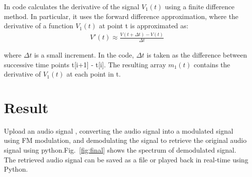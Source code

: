 \documentclass[journal,5pt,twocolumn]{IEEEtran}
\newcommand\figref{Fig.~\ref}
\begin{document}
In code calculates the derivative of the signal $V_1(t)$ using a finite difference method. In particular, it uses the forward difference approximation, where the derivative of a function $V_1(t)$ at point t is approximated as:
\begin{align}
V'(t) \approx \frac{V(t+\Delta t) - V(t)}{\Delta t}
\end{align}

 where ${\Delta t}$  is a small increment. In the code, ${\Delta t}$ is taken as the difference between successive time points t[i+1] - t[i].
 The resulting array $m_1(t)$  contains  the derivative of $V_1(t)$ at each point in t.

\section{\textbf{Result}}

  Upload an audio signal , converting the audio signal into a modulated signal using FM modulation,  and demodulating the signal to retrieve the original audio signal using python.\figref{fig:final} shows the spectrum of demodulated signal. The retrieved audio signal can be saved as a file or played back in real-time using Python.

\begin{center}
\end{center}
\end{document}
